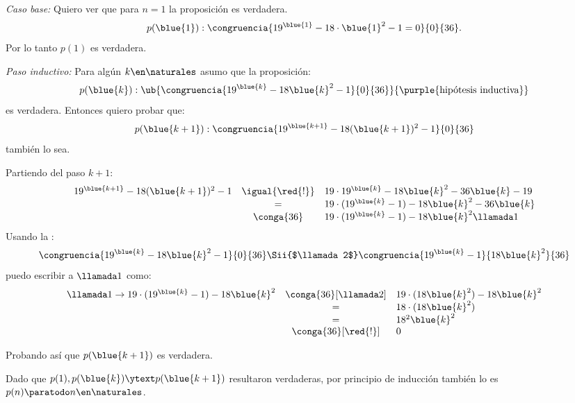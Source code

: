 \bigskip

\textit{Caso base:}
Quiero ver que para $n=1$ la proposición es verdadera.
$$
  p(\blue{1}) : \congruencia{19^{\blue{1}} -18 \cdot \blue{1}^2 - 1 = 0}{0}{36}.
$$
Por lo tanto $p(1)$ es verdadera.

\textit{Paso inductivo:}
Para algún $k \en \naturales$ asumo que la proposición:
$$
  p(\blue{k}) :
  \ub{
    \congruencia{19^{\blue{k}} - 18 \blue{k}^2 - 1}{0}{36}
  }{
    \text{\purple{hipótesis inductiva}}
  }
$$
es verdadera. Entonces quiero probar que:
$$
  p(\blue{k + 1}) : \congruencia{19^{\blue{k + 1}} -18 (\blue{k + 1})^2 - 1}{0}{36}
$$
también lo sea.

Partiendo del paso $k+1$:
$$
  \begin{array}{rcl}
    19^{\blue{k + 1}} -18 (\blue{k + 1})^2 - 1
     & \igual{\red{!}} &
    19 \cdot 19^{\blue{k}} - 18 \blue{k}^2 - 36\blue{k} - 19  \\
     & =               &
    19 \cdot (19^{\blue{k}} - 1) - 18 \blue{k}^2 - 36\blue{k} \\
     & \conga{36}      &
    19 \cdot (19^{\blue{k}} - 1) - 18 \blue{k}^2 \llamada1
  \end{array}
$$
Usando la :
$$
  \congruencia{19^{\blue{k}} - 18 \blue{k}^2 - 1}{0}{36}
  \Sii{$\llamada2$}
  \congruencia{19^{\blue{k}} - 1}{18 \blue{k}^2}{36}
$$
puedo escribir a $\llamada1$ como:
$$
  \begin{array}{rcl}
    \llamada1 \to 19 \cdot (19^{\blue{k}} - 1) - 18 \blue{k}^2
     & \conga{36}[\llamada2] &
    19 \cdot (18\blue{k}^2) - 18 \blue{k}^2 \\
     & =                     &
    18 \cdot (18\blue{k}^2)                 \\
     & =                     &
    18^2 \blue{k}^2                         \\
     & \conga{36}[\red{!}]   &
    0
  \end{array}
$$

Probando así que $p(\blue{k + 1})$ es verdadera.

Dado que $p(1), p(\blue{k}) \ytext p(\blue{k+1})$ resultaron verdaderas, por principio de inducción también lo es $p(n) \paratodo n \en \naturales$.

\begin{aportes}
  \item {}
\end{aportes}


